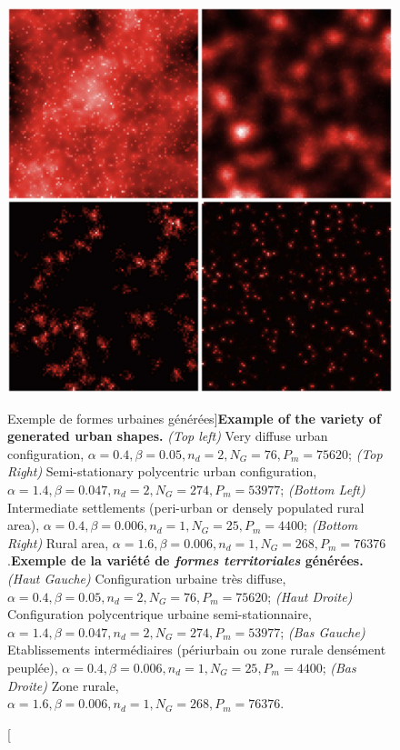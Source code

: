 \begin{figure}
\includegraphics[width=\linewidth]{Figures/Final/5-2-2-fig-density-fig2}
\caption[Example of the variety of generated urban shapes][Exemple de formes urbaines générées]{\textbf{Example of the variety of generated urban shapes.} \textit{(Top left)} Very diffuse urban configuration, $\alpha = 0.4,\beta = 0.05, n_d = 2, N_G = 76, P_m = 75620$; \textit{(Top Right)} Semi-stationary polycentric urban configuration, $\alpha = 1.4,\beta = 0.047, n_d = 2, N_G = 274, P_m = 53977$; \textit{(Bottom Left)} Intermediate settlements (peri-urban or densely populated rural area), $\alpha = 0.4,\beta = 0.006, n_d = 1, N_G = 25, P_m = 4400$; \textit{(Bottom Right)} Rural area, $\alpha = 1.6,\beta = 0.006, n_d = 1, N_G = 268, P_m = 76376$.\label{fig:density:fig2}}{\textbf{Exemple de la variété de \emph{formes territoriales} générées.} \textit{(Haut Gauche)} Configuration urbaine très diffuse, $\alpha = 0.4,\beta = 0.05, n_d = 2, N_G = 76, P_m = 75620$; \textit{(Haut Droite)} Configuration polycentrique urbaine semi-stationnaire, $\alpha = 1.4,\beta = 0.047, n_d = 2, N_G = 274, P_m = 53977$; \textit{(Bas Gauche)} Etablissements intermédiaires (périurbain ou zone rurale densément peuplée), $\alpha = 0.4,\beta = 0.006, n_d = 1, N_G = 25, P_m = 4400$; \textit{(Bas Droite)} Zone rurale, $\alpha = 1.6,\beta = 0.006, n_d = 1, N_G = 268, P_m = 76376$.\label{fig:density:fig2}}
\end{figure}




